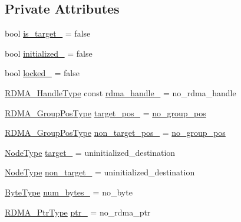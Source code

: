 \subsection*{Private Attributes}
\begin{DoxyCompactItemize}
\item 
bool \hyperlink{structvt_1_1rdma_1_1_channel_a377666458809a8384f298fd7c47f3172}{is\+\_\+target\+\_\+} = false
\item 
bool \hyperlink{structvt_1_1rdma_1_1_channel_a7aa5da1e8d8221db620fa3740f136d9b}{initialized\+\_\+} = false
\item 
bool \hyperlink{structvt_1_1rdma_1_1_channel_a788909186ab3c715dd5b44fa8314c5c6}{locked\+\_\+} = false
\item 
\hyperlink{namespacevt_a10442579ec4e7ebef223818e64bcf908}{R\+D\+M\+A\+\_\+\+Handle\+Type} const \hyperlink{structvt_1_1rdma_1_1_channel_afce2d3103af1c380f955972e9335c270}{rdma\+\_\+handle\+\_\+} = no\+\_\+rdma\+\_\+handle
\item 
\hyperlink{structvt_1_1rdma_1_1_channel_ae67759ab26cc035489edd369ae207cfc}{R\+D\+M\+A\+\_\+\+Group\+Pos\+Type} \hyperlink{structvt_1_1rdma_1_1_channel_a2d500c08cfff04453e181002f1d16cad}{target\+\_\+pos\+\_\+} = \hyperlink{structvt_1_1rdma_1_1_channel_a5b8e4d79d272951f51a9856705110d24}{no\+\_\+group\+\_\+pos}
\item 
\hyperlink{structvt_1_1rdma_1_1_channel_ae67759ab26cc035489edd369ae207cfc}{R\+D\+M\+A\+\_\+\+Group\+Pos\+Type} \hyperlink{structvt_1_1rdma_1_1_channel_aab4161123aa98085de1b2fbab5f76ec8}{non\+\_\+target\+\_\+pos\+\_\+} = \hyperlink{structvt_1_1rdma_1_1_channel_a5b8e4d79d272951f51a9856705110d24}{no\+\_\+group\+\_\+pos}
\item 
\hyperlink{namespacevt_a866da9d0efc19c0a1ce79e9e492f47e2}{Node\+Type} \hyperlink{structvt_1_1rdma_1_1_channel_a50932f1ef290b73c7d3010e5e5cd24f7}{target\+\_\+} = uninitialized\+\_\+destination
\item 
\hyperlink{namespacevt_a866da9d0efc19c0a1ce79e9e492f47e2}{Node\+Type} \hyperlink{structvt_1_1rdma_1_1_channel_aea0aa91cd0ab35f294ece2c16b46f99f}{non\+\_\+target\+\_\+} = uninitialized\+\_\+destination
\item 
\hyperlink{namespacevt_aab8d55968084610ce3b17057981e9300}{Byte\+Type} \hyperlink{structvt_1_1rdma_1_1_channel_af2828aad3c2db3071ba353645561922a}{num\+\_\+bytes\+\_\+} = no\+\_\+byte
\item 
\hyperlink{namespacevt_aab05b4a584f7ee835a6d0f66915cf59b}{R\+D\+M\+A\+\_\+\+Ptr\+Type} \hyperlink{structvt_1_1rdma_1_1_channel_a0e894313317bd3469e8dd16db791cc44}{ptr\+\_\+} = no\+\_\+rdma\+\_\+ptr

\end{DoxyCompactItemize}
